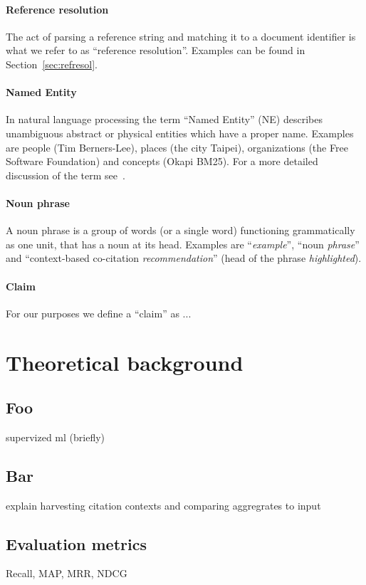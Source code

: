 \paragraph{Reference resolution} The act of parsing a reference string and matching it to a document identifier is what we refer to as ``reference resolution''. Examples can be found in Section~\ref{sec:refresol}.
\paragraph{Named Entity} In natural language processing the term ``Named Entity'' (NE) describes unambiguous abstract or physical entities which have a proper name. Examples are people (Tim Berners-Lee), places (the city Taipei), organizations (the Free Software Foundation) and concepts (Okapi BM25). For a more detailed discussion of the term see~\cite{Nadeau2007}.
\paragraph{Noun phrase} A noun phrase is a group of words (or a single word) functioning grammatically as one unit, that has a noun at its head. Examples are ``\emph{example}'', ``noun \emph{phrase}'' and ``context-based co-citation \emph{recommendation}'' (head of the phrase \emph{highlighted}).
\paragraph{Claim} For our purposes we define a ``claim'' as ...

\section{Theoretical background}
\subsection{Foo}
supervized ml (briefly)
\subsection{Bar}
explain harvesting citation contexts and comparing aggregrates to input
\subsection{Evaluation metrics}
Recall, MAP, MRR, NDCG
